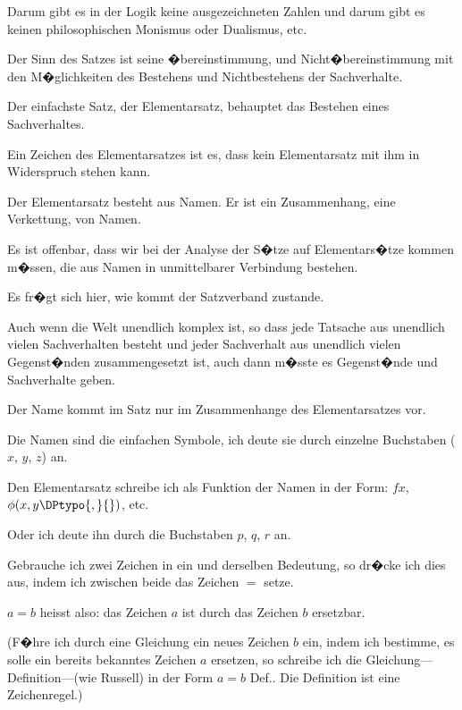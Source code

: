 \begin{propositions}
{Darum gibt es in der Logik keine ausgezeichneten
Zahlen und darum gibt es keinen philosophischen
Monismus oder Dualismus, etc.}


{Der Sinn des Satzes ist seine �bereinstimmung,
und Nicht�bereinstimmung mit den M�glichkeiten
des Bestehens und Nichtbestehens der
Sachverhalte.}


{Der einfachste Satz, der Elementarsatz, behauptet
das Bestehen eines Sachverhaltes.}


{Ein Zeichen des Elementarsatzes ist es, dass
kein Elementarsatz mit ihm in Widerspruch stehen
kann.}


{Der Elementarsatz besteht aus Namen. Er ist
ein Zusammenhang, eine Verkettung, von Namen.}


{Es ist offenbar, dass wir bei der Analyse der
S�tze auf Elementars�tze kommen m�ssen, die aus
Namen in unmittelbarer Verbindung bestehen.

Es fr�gt sich hier, wie kommt der Satzverband
zustande.}


{Auch wenn die Welt unendlich komplex ist,
so dass jede Tatsache aus unendlich vielen Sachverhalten
besteht und jeder Sachverhalt aus unendlich
vielen Gegenst�nden zusammengesetzt ist,
auch dann m�sste es Gegenst�nde und Sachverhalte
geben.}


{Der Name kommt im Satz nur im Zusammenhange
des Elementarsatzes vor.}


{Die Namen sind die einfachen Symbole, ich
deute sie durch einzelne Buchstaben (\glqq{}$x$\grqq{}, \glqq{}$y$\grqq{}, \glqq{}$z$\grqq{})
an.

Den Elementarsatz schreibe ich als Funktion
der Namen in der Form: \glqq{}$fx$\grqq{}, \glqq{}$\phi(x,y\DPtypo{,}{})$\grqq{}, etc.

Oder ich deute ihn durch die Buchstaben $p$, $q$,
$r$ an.}


{Gebrauche ich zwei Zeichen in ein und derselben
Bedeutung, so dr�cke ich dies aus, indem
ich zwischen beide das Zeichen \glqq{}$=$\grqq{} setze.

\glqq{}$a = b$\grqq{} heisst also: das Zeichen \glqq{}$a$\grqq{} ist durch
das Zeichen \glqq{}$b$\grqq{} ersetzbar.

(F�hre ich durch eine Gleichung ein neues
Zeichen \glqq{}$b$\grqq{} ein, indem ich bestimme, es solle ein
bereits bekanntes Zeichen \glqq{}$a$\grqq{} ersetzen, so schreibe
ich die Gleichung---Definition---(wie Russell) in
der Form \glqq{}$a = b$ Def.\grqq{}. Die Definition ist eine
Zeichenregel.)}



\end{propositions}
